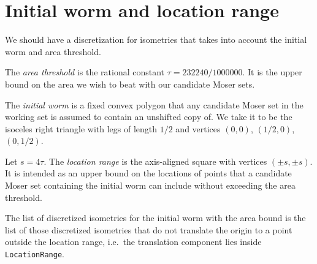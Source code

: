 


\section{Initial worm and location range}

We should have a discretization for isometries that takes into account the
initial worm and area threshold.

\begin{definition}
    \label{def:areaThreshold}
    The \emph{area threshold} is the rational constant
    $\tau = 232240 / 1000000$. It is the upper bound on the area we wish
    to beat with our candidate Moser sets.
\end{definition}

\begin{definition}
    \label{def:initialWorm}
    The \emph{initial worm} is a fixed convex polygon that any candidate
    Moser set in the working set is assumed to contain an unshifted copy
    of. We take it to be the isoceles right triangle with legs of length
    $1/2$ and vertices $(0,0)$, $(1/2, 0)$, $(0, 1/2)$.
\end{definition}

\begin{definition}
    \label{def:locationRange}
    Let $s = 4\tau$. The \emph{location range} is the axis-aligned square
    with vertices $(\pm s, \pm s)$. It is intended as an upper bound on
    the locations of points that a candidate Moser set containing the
    initial worm can include without exceeding the area threshold.
\end{definition}

\begin{definition}
    \label{def:discretizedIsometries}
    The list of discretized isometries for the initial worm with the
    area bound is the list of those discretized isometries that do not
    translate the origin to a point outside the location range, i.e.\
    the translation component lies inside \texttt{LocationRange}.
\end{definition}

